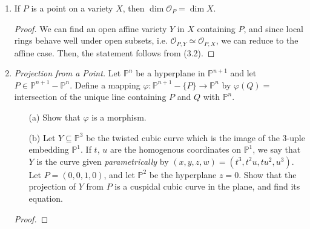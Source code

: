\documentclass[12pt]{article}
\newcommand{\A}{\mathbb{A}}
\newcommand{\OO}{\mathcal{O}}
\newcommand{\PP}{\mathbb{P}}
\theoremstyle{definition}
\begin{document}
\begin{enumerate} [label=\textbf{\arabic*.}, leftmargin=-0.05em]
\begin{proof}
    The ideal $I(X)$ consists of all polynomials in $k[x, y]$ that vanish at $X$. If $f \in I(X)$, then viewing $f$ as a regular function on $\A^2$, $f^{-1}(0)$ is a closed and dense subset of $\A^2$, hence it equals to $\A^2$, hence $I(X) = (0)$. Thus, if $X$ is affine, then
    \begin{equation*}
        \OO(X) = k[x, y] / I(X) \simeq k[x, y] = \OO(\A^2),
    \end{equation*}
    so by (3.5) and (3.7) $X \cong \A^2$ under the inclusion map, which is ridiculous.
\end{proof}

\item If $P$ is a point on a variety $X$, then $\dim{\OO_P} = \dim{X}$.

\begin{proof}
    We can find an open affine variety $Y$ in $X$ containing $P$, and since local rings behave well under open subsets, i.e. $\OO_{P, Y} \simeq \OO_{P, X}$, we can reduce to the affine case. Then, the statement follows from (3.2).
\end{proof}

\item \textit{Projection from a Point.} Let $\PP^n$ be a hyperplane in $\PP^{n + 1}$ and let $P \in \PP^{n + 1} - \PP^n$. Define a mapping $\varphi : \PP^{n + 1} - \{ P \} \to \PP^n$ by $\varphi(Q) = $ intersection of the unique line containing $P$ and $Q$ with $\PP^n$.
\begin{itemize}
    \item[(a)] Show that $\varphi$ is a morphism.
    \item[(b)] Let $Y \subseteq \PP^3$ be the twisted cubic curve which is the image of the $3$-uple embedding $\PP^1$. If $t$, $u$ are the homogenous coordinates on $\PP^1$, we say that $Y$ is the curve given \textit{parametrically} by $(x, y, z, w) = (t^3, t^2u, tu^2, u^3)$. Let $P = (0, 0, 1, 0)$, and let $\PP^2$ be the hyperplane $z = 0$. Show that the projection of $Y$ from $P$ is a cuspidal cubic curve in the plane, and find its equation. 
\end{itemize}

\begin{proof}
    
\end{proof}


\end{enumerate}
\end{document}
